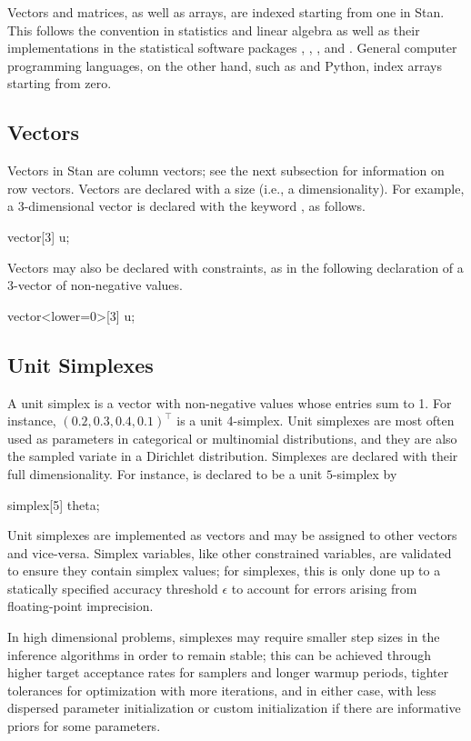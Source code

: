 Vectors and matrices, as well as arrays, are indexed starting from one
in Stan.  This follows the convention in statistics and linear
algebra as well as their implementations in the statistical software
packages \R, \MATLAB, \BUGS, and \JAGS.  General computer programming
languages, on the other hand, such as \Cpp and Python, index arrays
starting from zero.

\subsection{Vectors}

Vectors in Stan are column vectors; see the next subsection for
information on row vectors.  Vectors are declared with a size (i.e., a
dimensionality).  For example, a 3-dimensional vector is declared with
the keyword , as follows.
%
\begin{stancode}
vector[3] u;
\end{stancode}
%
Vectors may also be declared with constraints, as in the following
declaration of a 3-vector of non-negative values.
%
\begin{stancode}
vector<lower=0>[3] u;
\end{stancode}
%

\subsection{Unit Simplexes}

A unit simplex is a vector with non-negative values whose entries sum
to 1.  For instance, $(0.2,0.3,0.4,0.1)^{\top}$ is a unit 4-simplex.
Unit simplexes are most often used as parameters in categorical
or multinomial distributions, and they are also the sampled variate in
a Dirichlet distribution.  Simplexes are declared with their full
dimensionality.  For instance,  is declared to
be a unit $5$-simplex by
%
\begin{stancode}
simplex[5] theta;
\end{stancode}
%

Unit simplexes are implemented as vectors and may be assigned to other
vectors and vice-versa.  Simplex variables, like other constrained
variables, are validated to ensure they contain simplex values; for
simplexes, this is only done up to a statically specified accuracy
threshold $\epsilon$ to account for errors arising from floating-point
imprecision.

In high dimensional problems, simplexes may require smaller step sizes
in the inference algorithms in order to remain stable; this can be
achieved through higher target acceptance rates for samplers and
longer warmup periods, tighter tolerances for optimization with more
iterations, and in either case, with less dispersed parameter
initialization or custom initialization if there are informative
priors for some parameters.


